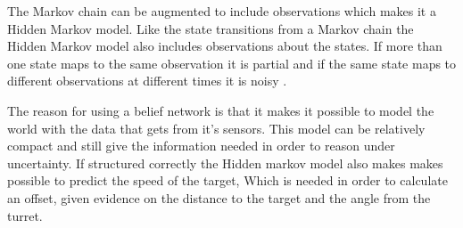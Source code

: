 The Markov chain can be augmented to include observations which makes it a
Hidden Markov model. Like the state transitions from a Markov chain the Hidden
Markov model also includes observations about the states. If more than one state
maps to the same observation it is partial and if the same state maps to
different observations at different times it is noisy \citep[6.5.2]{MIBook}.\nl 
% 
% 

The reason for using a belief network is that it makes it possible to model the
world with the data that \name gets from it's sensors. This model can be
relatively compact and still give the information needed in order to reason
under uncertainty. If structured correctly the Hidden markov model also makes
makes possible to predict the speed of the target, Which is needed in order to
calculate an offset, given evidence on the distance to the target and the angle
from the turret. 
